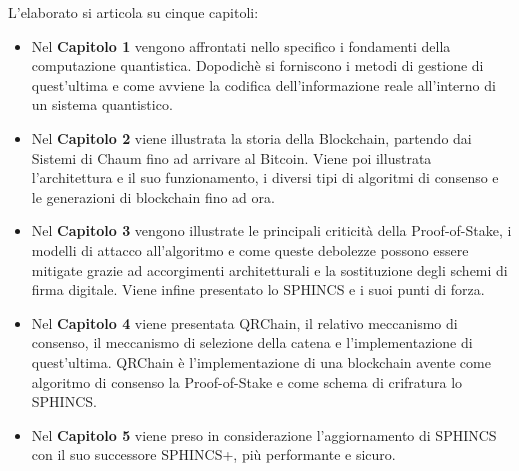 L'elaborato si articola su cinque capitoli:
\begin{itemize}
  \item Nel \textbf{Capitolo 1} vengono affrontati nello specifico i fondamenti della computazione quantistica. Dopodichè si forniscono i metodi di gestione di quest'ultima e come avviene la codifica dell'informazione reale all'interno di un sistema quantistico.
  \item Nel \textbf{Capitolo 2} viene illustrata la storia della Blockchain, partendo dai Sistemi di Chaum fino ad arrivare al Bitcoin. Viene poi illustrata l'architettura e il suo funzionamento, i diversi tipi di algoritmi di consenso e le generazioni di blockchain fino ad ora.
  \item Nel \textbf{Capitolo 3} vengono illustrate le principali criticità della Proof-of-Stake, i modelli di attacco all'algoritmo e come queste debolezze possono essere mitigate grazie ad accorgimenti architetturali e la sostituzione degli schemi di firma digitale. Viene infine presentato lo SPHINCS e i suoi punti di forza.
  \item Nel \textbf{Capitolo 4} viene presentata QRChain, il relativo meccanismo di consenso, il meccanismo di selezione della catena e l'implementazione di quest'ultima. QRChain è l'implementazione di una blockchain avente come algoritmo di consenso la Proof-of-Stake e come schema di crifratura lo SPHINCS.
  \item Nel \textbf{Capitolo 5} viene preso in considerazione l'aggiornamento di SPHINCS con il suo successore SPHINCS+, più performante e sicuro.
\end{itemize}
